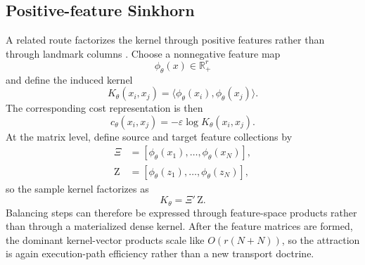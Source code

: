 \subsection{Positive-feature Sinkhorn}
\label{sec:bf-learned-ot-positive-feature}

A related route factorizes the kernel through positive features rather than through
landmark columns \citep{scetbon2020positivefeatures}.  Choose a nonnegative
feature map
\begin{equation}
\label{eq:bf-learned-ot-positive-map}
  \phi_\theta(x)\in\mathbb R_+^r
\end{equation}
and define the induced kernel
\begin{equation}
\label{eq:bf-learned-ot-positive-kernel}
  K_\theta(x_i,x_j)
  =
  \langle \phi_\theta(x_i),\phi_\theta(x_j)\rangle.
\end{equation}
The corresponding cost representation is then
\begin{equation}
\label{eq:bf-learned-ot-positive-cost}
  c_\theta(x_i,x_j)
  =
  -\varepsilon\log K_\theta(x_i,x_j).
\end{equation}
At the matrix level, define source and target feature collections by
\begin{align}
\label{eq:bf-learned-ot-positive-matrices}
  \Xi
  &=
  [\phi_\theta(x_1),\ldots,\phi_\theta(x_N)],\\
  \mathrm Z
  &=
  [\phi_\theta(z_1),\ldots,\phi_\theta(z_N)],
\end{align}
so the sample kernel factorizes as
\begin{equation}
\label{eq:bf-learned-ot-positive-factorization}
  K_\theta = \Xi'\,\mathrm Z.
\end{equation}
Balancing steps can therefore be expressed through feature-space products rather
than through a materialized dense kernel.  After the feature matrices are formed,
the dominant kernel-vector products scale like \(O(r(N+N))\), so the attraction is
again execution-path efficiency rather than a new transport doctrine.


